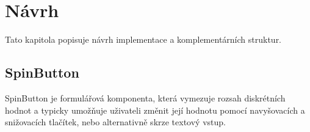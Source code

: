 \chapter{Návrh}

Tato kapitola popisuje návrh implementace a komplementárních struktur.

\section{SpinButton}

SpinButton je formulářová komponenta, která vymezuje rozsah diskrétních hodnot a typicky umožňuje uživateli změnit její hodnotu pomocí navyšovacích a snižovacích tlačítek, nebo alternativně skrze textový vstup.
